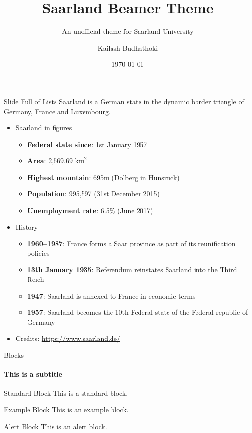 \documentclass[aspectratio=169]{beamer}
\author{Kailash Budhathoki}
\title{Saarland Beamer Theme}
\subtitle{An unofficial theme for Saarland University}
\institute{Max Planck Institute for Informatics and Saarland University}
\date{\today}
\begin{document}
	\begin{frame}[plain]
		\titlepage
	\end{frame}
	
	\begin{frame}{Slide Full of Lists}
	Saarland is a German state in the dynamic border triangle of Germany, France and Luxembourg. 
		\begin{itemize}
			\item Saarland in figures
				\begin{itemize}
					\item \textbf{Federal state since}: 1st January 1957
					\item \textbf{Area}: 2,569.69 $\text{km}^2$
					\item \textbf{Highest mountain}: 695m (Dolberg in Hunsrück)
					\item \textbf{Population}: 995,597 (31st December 2015)
					\item \textbf{Unemployment rate}: 6.5\% (June 2017)
				\end{itemize}
			\item History
				\begin{itemize}
					\item \textbf{1960--1987}: France forms a Saar province as part of its reunification policies
					\item \textbf{13th January 1935}: Referendum reinstates Saarland into the Third Reich
					\item \textbf{1947}: Saarland is annexed to France in economic terms
					\item \textbf{1957}: Saarland becomes the 10th Federal state of the Federal republic of Germany
				\end{itemize}
			\item Credits: \url{https://www.saarland.de/}
		\end{itemize}
	\end{frame}

	\begin{frame}{Blocks}
		\framesubtitle{This is a subtitle}
		\begin{block}{Standard Block}
			This is a standard block.
		\end{block}
		
		\begin{exampleblock}{Example Block}
			This is an example block.
		\end{exampleblock}
		
		\begin{alertblock}{Alert Block}
			This is an alert block.
		\end{alertblock}
	\end{frame}
	
\end{document}
